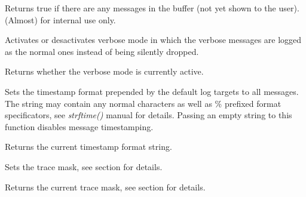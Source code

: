 Returns true if there are any messages in the buffer (not yet shown to the
user). (Almost) for internal use only.

\label{wxlogsetverbose}


Activates or desactivates verbose mode in which the verbose messages are
logged as the normal ones instead of being silently dropped.

\label{wxloggetverbose}


Returns whether the verbose mode is currently active.

\label{wxlogsettimestampformat}


Sets the timestamp format prepended by the default log targets to all
messages. The string may contain any normal characters as well as \%
prefixed format specificators, see {\it strftime()} manual for details.
Passing an empty string to this function disables message timestamping.

\label{wxloggettimestampformat}


Returns the current timestamp format string.

\label{wxlogsettracemask}


Sets the trace mask, see 
section for details.

\label{wxloggettracemask}

Returns the current trace mask, see  section
for details.
